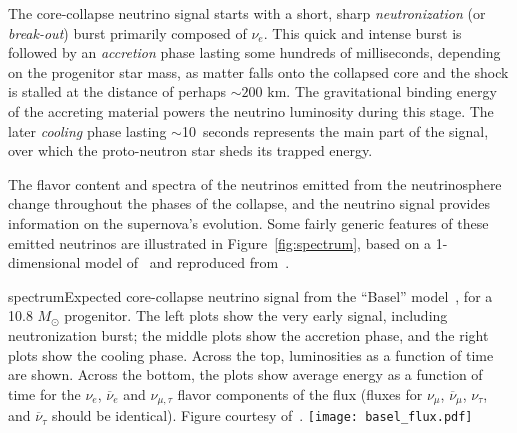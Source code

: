 The core-collapse neutrino signal starts with a short, sharp
\emph{neutronization} (or \emph{break-out}) burst primarily composed of
$\nu_e$. %
This quick and intense burst is followed by an
\emph{accretion} phase lasting some hundreds of milliseconds, depending on the progenitor star mass, as matter falls onto the collapsed core and the shock is stalled at the distance of perhaps $\sim 200$ km. The gravitational binding energy of the accreting material powers the neutrino luminosity during this stage. The later
\emph{cooling} phase %
lasting $\sim$10~seconds represents the main part of
the signal, over which the proto-neutron star sheds its trapped energy.  


The flavor content and spectra of the neutrinos emitted from the neutrinosphere change
throughout the phases of the collapse, and the neutrino signal provides information on the supernova's evolution. %
Some fairly generic features of these emitted neutrinos are illustrated in Figure~\ref{fig:spectrum}, based on a 1-dimensional model of~\cite{Fischer:2009af} and reproduced from~\cite{Wurm:2011zn}.
\begin{cdrfigure}{spectrum}{Expected
  core-collapse neutrino signal from the ``Basel''
  model~\cite{Fischer:2009af}, for a
  10.8 $M_{\odot}$ progenitor.  The left plots show the very early
  signal, including neutronization burst; the middle plots show
  the accretion phase, and the right plots show the cooling
  phase. Across the top, luminosities as a function of time are shown. 
  Across the bottom, the plots show average energy as a function of time for the
  $\nu_e$, $\overline{\nu}_e$ and $\nu_{\mu,\tau}$ flavor components of the
  flux (fluxes for $\nu_\mu$, $\overline{\nu}_\mu$, $\nu_\tau$,
  and $\overline{\nu}_\tau$ should be identical).  Figure courtesy of~\cite{Wurm:2011zn}.}
\texttt{[image: basel\_flux.pdf]}
\end{cdrfigure}

